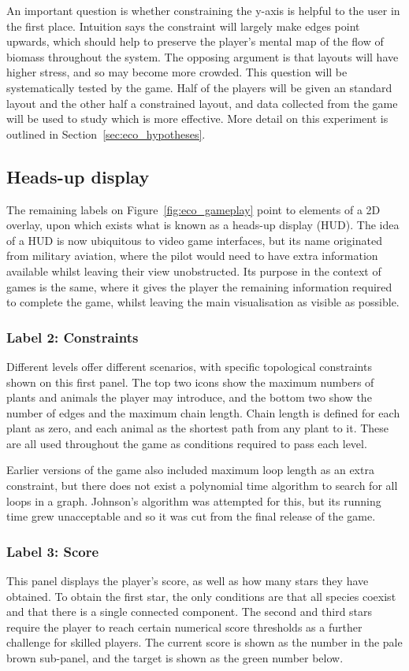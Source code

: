 An important question is whether constraining the y-axis is helpful to the user in the first place. Intuition says the constraint will largely make edges point upwards, which should help to preserve the player's mental map of the flow of biomass throughout the system. The opposing argument is that layouts will have higher stress, and so may become more crowded.
This question will be systematically tested by the game. Half of the players will be given an standard layout and the other half a constrained layout, and data collected from the game will be used to study which is more effective. More detail on this experiment is outlined in Section~\ref{sec:eco_hypotheses}.

\subsection{Heads-up display}
\label{sec:HUD}
The remaining labels on Figure~\ref{fig:eco_gameplay} point to elements of a 2D overlay, upon which exists what is known as a heads-up display (HUD). The idea of a HUD is now ubiquitous to video game interfaces, but its name originated from military aviation, where the pilot would need to have extra information available whilst leaving their view unobstructed. 
Its purpose in the context of games is the same, where it gives the player the remaining information required to complete the game, whilst leaving the main visualisation as visible as possible.

\subsubsection{Label 2: Constraints}
Different levels offer different scenarios, with specific topological constraints shown on this first panel. The top two icons show the maximum numbers of plants and animals the player may introduce, and the bottom two show the number of edges and the maximum chain length. Chain length is defined for each plant as zero, and each animal as the shortest path from any plant to it. These are all used throughout the game as conditions required to pass each level.

Earlier versions of the game also included maximum loop length as an extra constraint, but there does not exist a polynomial time algorithm to search for all loops in a graph. Johnson's algorithm \cite{Johnson1975} was attempted for this, but its running time grew unacceptable and so it was cut from the final release of the game.

\subsubsection{Label 3: Score}
This panel displays the player's score, as well as how many stars they have obtained. To obtain the first star, the only conditions are that all species coexist and that there is a single connected component. The second and third stars require the player to reach certain numerical score thresholds as a further challenge for skilled players. The current score is shown as the number in the pale brown sub-panel, and the target is shown as the green number below.


